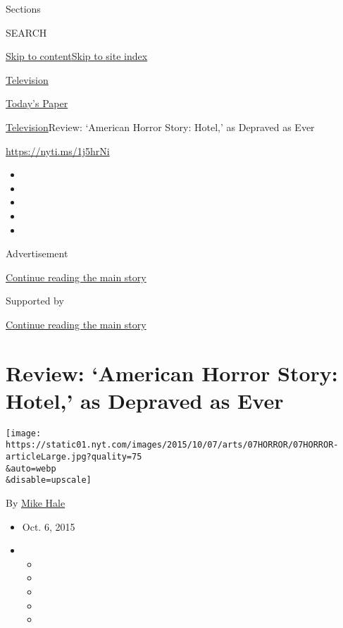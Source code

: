 Sections

SEARCH

\protect\hyperlink{site-content}{Skip to
content}\protect\hyperlink{site-index}{Skip to site index}

\href{https://www.nytimes.com/section/arts/television}{Television}

\href{https://myaccount.nytimes.com/auth/login?response_type=cookie\&client_id=vi}{}

\href{https://www.nytimes.com/section/todayspaper}{Today's Paper}

\href{/section/arts/television}{Television}\textbar{}Review: `American
Horror Story: Hotel,' as Depraved as Ever

\href{https://nyti.ms/1j5hrNi}{https://nyti.ms/1j5hrNi}

\begin{itemize}
\item
\item
\item
\item
\item
\end{itemize}

Advertisement

\protect\hyperlink{after-top}{Continue reading the main story}

Supported by

\protect\hyperlink{after-sponsor}{Continue reading the main story}

\hypertarget{review-american-horror-story-hotel-as-depraved-as-ever}{%
\section{Review: `American Horror Story: Hotel,' as Depraved as
Ever}\label{review-american-horror-story-hotel-as-depraved-as-ever}}

\texttt{[image: https://static01.nyt.com/images/2015/10/07/arts/07HORROR/07HORROR-articleLarge.jpg?quality=75\\\&auto=webp\\\&disable=upscale]}

By \href{http://www.nytimes.com/by/mike-hale}{Mike Hale}

\begin{itemize}
\item
  Oct. 6, 2015
\item
  \begin{itemize}
  \item
  \item
  \item
  \item
  \item
  \end{itemize}
\end{itemize}

